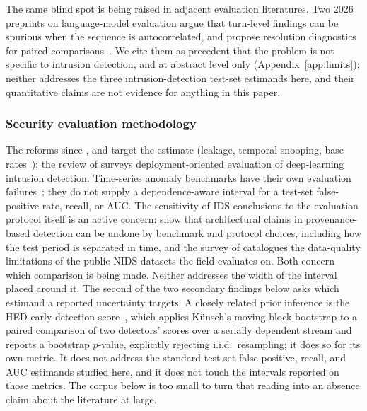 \documentclass[a4paper,fleqn]{cas-dc}
\begin{document}
The same blind spot is being raised in adjacent evaluation literatures. Two 2026 preprints on
language-model evaluation argue that turn-level findings can be spurious when the sequence is
autocorrelated, and propose resolution diagnostics for paired
comparisons~\citep{llmeval2026autocorr,llmeval2026resolution}. We cite them as precedent that the
problem is not specific to intrusion detection, and at abstract level only
(Appendix~\ref{app:limits}); neither addresses the three intrusion-detection test-set estimands
here, and their quantitative claims are not evidence for anything in this paper.

\subsubsection{Security evaluation methodology}
The reforms since \citet{sommer2010outside}, \citet{arp2022dos} and
\citet{pendlebury2019tesseract} target the
estimate (leakage, temporal snooping, base rates~\citep{axelsson2000baserate}); the review of \citet{lew2026deployment}
surveys deployment-oriented evaluation of deep-learning intrusion detection. Time-series anomaly
benchmarks have their own evaluation failures~\citep{wu2021current}; they do not supply a
dependence-aware interval for a test-set false-positive rate, recall, or AUC. The sensitivity of
IDS conclusions to the evaluation protocol itself is an active concern: \citet{guerra2026protocols} show that
architectural claims in provenance-based detection can be undone by benchmark and protocol choices,
including how the test period is separated in time, and the survey of
\citet{goldschmidt2025datasets} catalogues the data-quality limitations of the public NIDS
datasets the field evaluates on. Both concern which
comparison is being made. Neither addresses the width of the interval placed around it. The second of the
two secondary findings below asks which estimand a reported uncertainty targets. A closely related prior inference is the HED
early-detection score~\citep{hiremath2026hed}, which
applies K\"unsch's moving-block bootstrap to a paired comparison of two detectors' scores over a
serially dependent stream and reports a bootstrap $p$-value, explicitly rejecting i.i.d.\ resampling;
it does so for its own metric. It does not address the standard test-set false-positive, recall,
and AUC estimands studied here, and it does not touch the intervals reported on those metrics.
The corpus below is too small to turn that reading into an absence claim about the literature at large.
\end{document}
